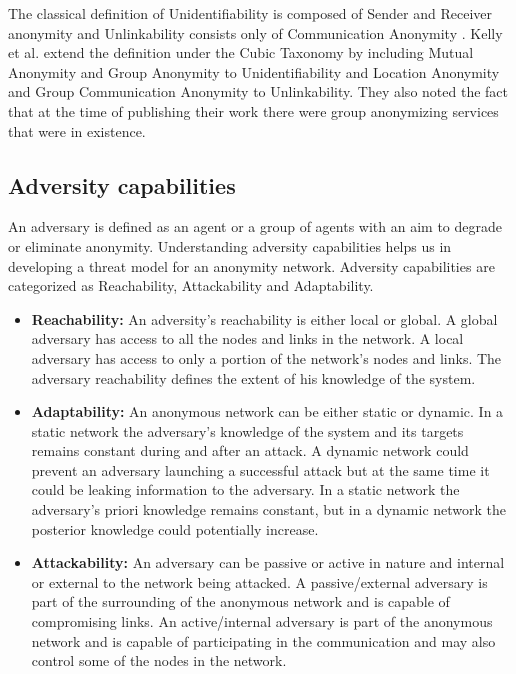 \documentclass{llncs}
\begin{document}
The classical definition of Unidentifiability is composed of Sender and Receiver anonymity and Unlinkability consists only of Communication Anonymity \cite{terminology}. Kelly et al. \cite{kelly2012exploring} extend the definition under the Cubic Taxonomy by including Mutual Anonymity and Group Anonymity to Unidentifiability and Location Anonymity and Group Communication Anonymity to Unlinkability. They also noted the fact that at the time of publishing their work there were group anonymizing services that were in existence.

\subsection{Adversity capabilities}
An adversary is defined as an agent or a group of agents with an aim to degrade or eliminate anonymity. Understanding adversity capabilities helps us in developing a threat model for an anonymity network. Adversity capabilities are categorized as Reachability, Attackability and Adaptability.

\begin{itemize}
	\item[]{\textbf{Reachability:} An adversity's reachability is either local or global. A global adversary has access to all the nodes and links in the network. A local adversary has access to only a portion of the network's nodes and links. The adversary reachability defines the extent of his knowledge of the system.}
	\item[]{\textbf{Adaptability:} An anonymous network can be either static or dynamic. In a static network the adversary's knowledge of the system and its targets remains constant during and after an attack. A dynamic network could prevent an adversary launching a successful attack but at the same time it could be leaking information to the adversary. In a static network the adversary's priori knowledge remains constant, but in a dynamic network the posterior knowledge could potentially increase.}
	\item[]{\textbf{Attackability:} An adversary can be passive or active in nature and internal or external to the network being attacked. A passive/external adversary is part of the surrounding of the anonymous network and is capable of compromising links. An active/internal adversary is part of the anonymous network and is capable of participating in the communication and may also control some of the nodes in the network.}
\end{itemize}
\end{document}
